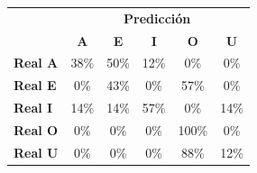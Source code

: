 \begin{tabular}{lccccc}
\toprule
 & \multicolumn{5}{c}{\textbf{Predicción}} \\
 & \textbf{A} & \textbf{E} & \textbf{I} & \textbf{O} & \textbf{U} \\
\midrule
\textbf{Real A} & \cellcolor[rgb]{0.74,0.74,1.00}  38\% & \cellcolor[rgb]{0.65,0.65,1.00} \color{white} 50\% & \cellcolor[rgb]{0.91,0.91,1.00}  12\% & \cellcolor[rgb]{1.00,1.00,1.00}  0\% & \cellcolor[rgb]{1.00,1.00,1.00}  0\% \\
\textbf{Real E} & \cellcolor[rgb]{1.00,1.00,1.00}  0\% & \cellcolor[rgb]{0.70,0.70,1.00}  43\% & \cellcolor[rgb]{1.00,1.00,1.00}  0\% & \cellcolor[rgb]{0.60,0.60,1.00} \color{white} 57\% & \cellcolor[rgb]{1.00,1.00,1.00}  0\% \\
\textbf{Real I} & \cellcolor[rgb]{0.90,0.90,1.00}  14\% & \cellcolor[rgb]{0.90,0.90,1.00}  14\% & \cellcolor[rgb]{0.60,0.60,1.00} \color{white} 57\% & \cellcolor[rgb]{1.00,1.00,1.00}  0\% & \cellcolor[rgb]{0.90,0.90,1.00}  14\% \\
\textbf{Real O} & \cellcolor[rgb]{1.00,1.00,1.00}  0\% & \cellcolor[rgb]{1.00,1.00,1.00}  0\% & \cellcolor[rgb]{1.00,1.00,1.00}  0\% & \cellcolor[rgb]{0.30,0.30,1.00} \color{white} 100\% & \cellcolor[rgb]{1.00,1.00,1.00}  0\% \\
\textbf{Real U} & \cellcolor[rgb]{1.00,1.00,1.00}  0\% & \cellcolor[rgb]{1.00,1.00,1.00}  0\% & \cellcolor[rgb]{1.00,1.00,1.00}  0\% & \cellcolor[rgb]{0.39,0.39,1.00} \color{white} 88\% & \cellcolor[rgb]{0.91,0.91,1.00}  12\% \\
\bottomrule
\end{tabular}